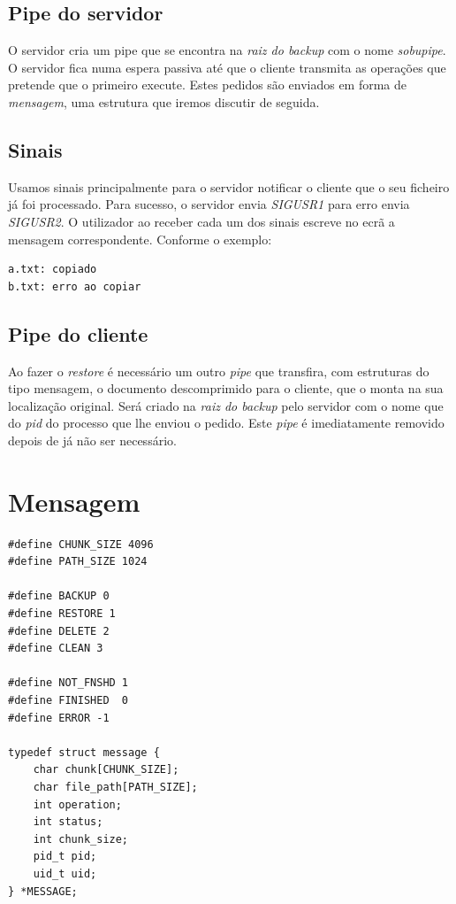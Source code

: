 \documentclass[12pt,a4paper]{report}
\begin{document}
\section{Pipe do servidor}
O servidor cria um pipe que se encontra na \emph{raiz do backup} com o nome \emph{sobupipe}. O servidor fica numa espera passiva até que o cliente transmita as operações que pretende que o primeiro execute. Estes pedidos são enviados em forma de \emph{mensagem}, uma estrutura que iremos discutir de seguida.

\section{Sinais}
Usamos sinais principalmente para o servidor notificar o cliente que o seu ficheiro já foi processado. Para sucesso, o servidor envia \emph{SIGUSR1} para erro envia \emph{SIGUSR2}. O utilizador ao receber cada um dos sinais escreve no ecrã a mensagem correspondente. Conforme o exemplo:
\begin{lstlisting}
a.txt: copiado
b.txt: erro ao copiar
\end{lstlisting}

\section{Pipe do cliente}
Ao fazer o \emph{restore} é necessário um outro \emph{pipe} que transfira, com estruturas do tipo mensagem, o documento descomprimido para o cliente, que o monta na sua localização original. Será criado na \emph{raiz do backup} pelo servidor com o nome que do \emph{pid} do processo que lhe enviou o pedido. Este \emph{pipe} é imediatamente removido depois de já não ser necessário.  

\chapter{Mensagem}

\begin{lstlisting}
#define CHUNK_SIZE 4096
#define PATH_SIZE 1024

#define BACKUP 0
#define RESTORE 1
#define DELETE 2
#define CLEAN 3

#define NOT_FNSHD 1
#define FINISHED  0 
#define ERROR -1

typedef struct message {
    char chunk[CHUNK_SIZE];
    char file_path[PATH_SIZE];
    int operation;
    int status;
    int chunk_size;
    pid_t pid;
    uid_t uid;
} *MESSAGE;
\end{lstlisting}
\end{document}
